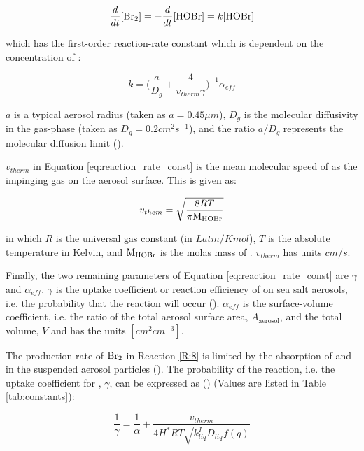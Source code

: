 \begin{equation*}
    \frac{d}{dt}[\mathrm{Br_2}] = -\frac{d}{dt}[\mathrm{HOBr}] = k[\mathrm{HOBr}]
\end{equation*}

which has the first-order reaction-rate constant which is dependent on the concentration of : 

\begin{equation}
    k = \big(\frac{a}{D_g} + \frac{4}{v_{therm}\gamma}\big)^{-1}\alpha_{eff}
    \label{eq:reaction_rate_const}
\end{equation}

$a$ is a typical aerosol radius (taken as $a = 0.45 \mu m$), $D_g$ is the molecular diffusivity in the gas-phase (taken as $D_g = 0.2  cm^2s^{-1}$), and the ratio $a/D_g$ represents the molecular diffusion limit (\cite{CAO}). 

\medskip

$v_{therm}$ in Equation \ref{eq:reaction_rate_const} is the mean molecular speed of  as the impinging gas on the aerosol surface. This is given as:

\begin{equation*}
    v_{them} = \sqrt{\frac{8RT}{\pi \mathrm{M_{HOBr}}}}
\end{equation*}

in which $R$ is the universal gas constant (in $Latm/Kmol$), $T$ is the absolute temperature in Kelvin,  and $\mathrm{M_{HOBr}}$ is the molas mass of . $v_{therm}$ has units $cm/s$. 

\medskip

Finally, the two remaining parameters of Equation \ref{eq:reaction_rate_const} are $\gamma$ and $\alpha_{eff}$. $\gamma$ is the uptake coefficient or reaction efficiency of  on sea salt aerosols, i.e. the probability that the reaction will occur (\cite{SeinfeldSpyros}). $\alpha_{eff}$ is the surface-volume coefficient, i.e. the ratio of the total aerosol surface area, $A_{\text{aerosol}}$, and the total volume, $V$ and has the units $[cm^2cm^{-3}]$.
 
\medskip

The production rate of $\mathrm{Br_2}$ in Reaction \ref{R:8} is limited by the absorption of  and  in the suspended aerosol particles (\cite{CAO}). The probability of the reaction, i.e. the uptake coefficient for , $\gamma$,  can be expressed as (\cite{Hanson1994}) (Values are listed in Table \ref{tab:constants}): 

\begin{equation}
    \frac{1}{\gamma} = \frac{1}{\alpha}+ \frac{v_{therm}}{4H^*RT\sqrt{k_{liq}^ID_{liq}}f(q)}
    \label{eq:upt_coeff}
\end{equation}

